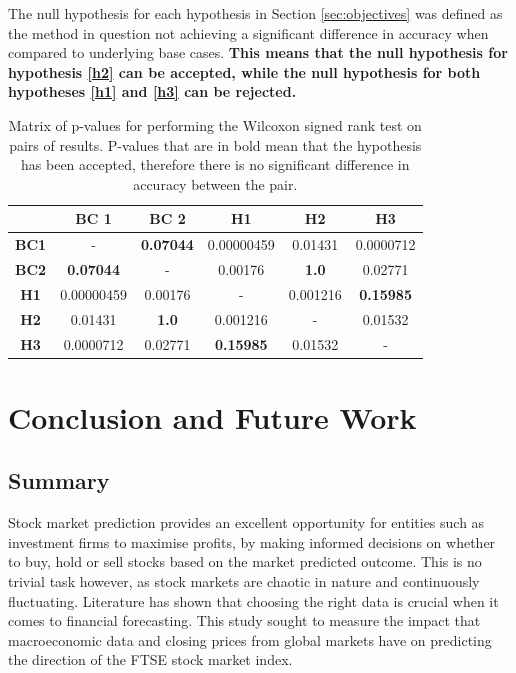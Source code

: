 \documentclass{UoYCSproject}
\begin{document}
The null hypothesis for each hypothesis in Section \ref{sec:objectives} was defined as the method in question not achieving a significant difference in accuracy when compared to  underlying base cases. \textbf{This means that the null hypothesis for hypothesis \ref{h2} can be accepted, while the null hypothesis for both hypotheses \ref{h1} and \ref{h3} can be rejected.}

\begin{table}[h]
    \centering
    \begin{tabular}{|c|c|c|c|c|c|} \hline
         &  \textbf{BC 1} & \textbf{BC 2} & \textbf{H1} & \textbf{H2} & \textbf{H3} \\ \hline
        \textbf{BC1} & - & \textbf{0.07044} & 0.00000459 &  0.01431 & 0.0000712\\
        \textbf{BC2} & \textbf{0.07044} & - & 0.00176 & \textbf{1.0} & 0.02771 \\
        \textbf{H1} & 0.00000459 & 0.00176 & - & 0.001216 & \textbf{0.15985} \\
        \textbf{H2} & 0.01431 & \textbf{1.0} & 0.001216 & - & 0.01532\\
        \textbf{H3} & 0.0000712 & 0.02771 & \textbf{0.15985} & 0.01532 & -  \\
        \hline
    \end{tabular}
    \caption{Matrix of p-values for performing the Wilcoxon signed rank test on pairs of results. P-values that are in bold mean that the hypothesis has been accepted, therefore there is no significant difference in accuracy between the pair. }
    \label{tab:wilcoxon_results}
\end{table}


\chapter{Conclusion and Future Work}
\label{cha:conclusions}

\section{Summary}
Stock market prediction provides an excellent opportunity for entities such as investment firms to maximise profits, by making informed decisions on whether to buy, hold or sell stocks based on the market predicted outcome. This is no trivial task however, as stock markets are chaotic in nature and continuously fluctuating. Literature has shown that choosing the right data is crucial when it comes to financial forecasting. This study sought to measure the impact that macroeconomic data and closing prices from global markets have on predicting the direction of the FTSE stock market index. 
\end{document}
